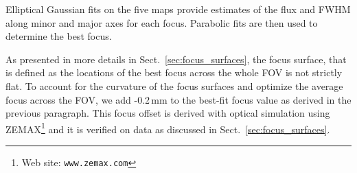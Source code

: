 
Elliptical Gaussian fits on the five maps provide estimates of
the flux and FWHM along minor and major axes for each focus. Parabolic fits are
then used to determine the best focus.%

As presented in more details in Sect.~\ref{sec:focus_surfaces}, the focus
surface, that is defined as the locations of the best focus across the whole FOV
is not strictly flat.
To account for the curvature of the focus surfaces and optimize the
average focus across the FOV, we add -0.2\,mm to the best-fit focus value as derived
in the previous paragraph. This focus offset is derived with optical
simulation using ZEMAX\footnote{Web site: \tt{www.zemax.com}} and it is verified on data as discussed in
Sect.~\ref{sec:focus_surfaces}.


